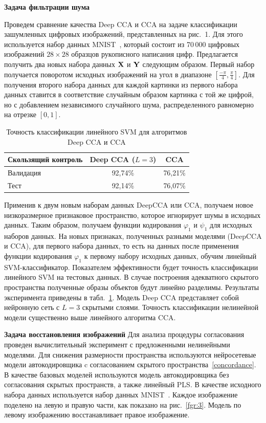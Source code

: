 \textbf{Задача фильтрации шума}

Проведем сравнение качества Deep CCA и CCA на задаче классификации зашумленных цифровых изображений, представленных на рис.~1. Для этого используется набор данных MNIST~\cite{MNIST}, который состоит из 70\,000 цифровых изображений $28 \times 28$ образцов рукописного написания цифр. Предлагается получить два новых набора данных $\mathbf{X}$ и $\mathbf{Y}$ следующим образом. Первый набор получается поворотом исходных изображений на угол в диапазоне $[\frac{-\pi}{4}, \frac{\pi}{4}]$. Для получения второго набора данных для каждой картинки из первого набора данных ставится в соответствие случайным образом картинка с той же цифрой, но с добавлением независимого случайного шума, распределенного равномерно на отрезке $[0,1]$.

\begin{table}[!bp]
\caption{Точность классификации линейного SVM для алгоритмов Deep CCA и CCA}
\centering
\begin{tabular}{l|cc}
\hline
	Скользящий контроль & Deep CCA ($L=3$) & CCA \\  \hline
	Валидация & 92,74\%  &  76,21\%\\
	Тест & 92,14\% & 76,07\% \\
	\hline
\end{tabular}
\label{tbl:1}
\end{table}

Применив к двум новым наборам данных DeepCCA или CCA, получаем новое низкоразмерное признаковое пространство, которое игнорирует шумы в исходных данных. Таким образом, получаем функции кодирования $\varphi_1$ и $\psi_1$ для исходных наборов данных. На новых признаках, полученных разными моделями (DeepCCA и CCA), для первого набора данных, то есть на данных после применения функции кодирования $\varphi_1$ к первому набору исходных данных, обучим линейный SVM-классификатор. Показателем эффективности будет точность классификации линейного SVM на тестовых данных. В случае построения адекватного скрытого пространства полученные образы объектов будут линейно разделимы. Результаты эксперимента приведены в табл.~\ref{tbl:1}. Модель Deep CCA представляет собой нейронную сеть с $L=3$ скрытыми слоями. Точность классификации нелинейной модели существенно выше линейного алгоритма CCA.

\textbf{Задача восстановления изображений}
Для анализа процедуры согласования проведен вычислительный эксперимент с предложенными нелинейными моделями.
Для снижения размерности пространства используются нейросетевые модели автокодировщика c согласованием скрытого пространства~\eqref{concordance}.
В качестве базовых моделей используются модель автокодировщика без согласования скрытых пространств, а также линейный PLS. В качестве исходного набора данных используется набор данных MNIST~\cite{MNIST}. Каждое изображение поделено на левую и правую части, как показано на рис.~\ref{fgr:3}. Модель по левому изображению восстанавливает правое изображение.


